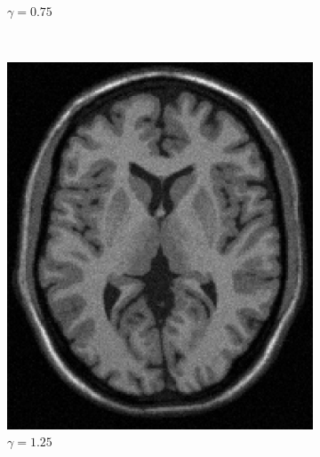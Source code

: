 \documentclass[letterpaper,12pt]{article}
\theoremstyle{plain}
\begin{document}
\begin{figure}[H]
\begin{subfigure}[h]{0.2\textwidth}
            \caption{$\gamma = 0.75$} 
         \end{subfigure}
         \\
         \begin{subfigure}[h]{0.2\textwidth}
            \centering
            \includegraphics[width=\textwidth]{Figuras/ImageA_exp_gamma=1.25.png}
            \caption{$\gamma = 1.25$} 
         \end{subfigure}
         \begin{subfigure}[h]{0.2\textwidth}
            \centering

\end{subfigure}
\end{figure}
\end{document}
